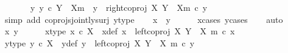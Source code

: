 \begin{isabellebody}
\ \ \ \ {\isasymor}\ \ {\isacharparenleft}{\kern0pt}{\isasymexists}\ y{\isacharprime}{\kern0pt}{\isachardot}{\kern0pt}\ y{\isacharprime}{\kern0pt}\ {\isasymin}\isactrlsub c\ Y\ {\isasymsetminus}\ {\isacharparenleft}{\kern0pt}X{\isacharcomma}{\kern0pt}m{\isacharparenright}{\kern0pt}\ {\isasymand}\ y\ {\isacharequal}{\kern0pt}\ right{\isacharunderscore}{\kern0pt}coproj\ X\ {\isacharparenleft}{\kern0pt}Y\ {\isasymsetminus}\ {\isacharparenleft}{\kern0pt}X{\isacharcomma}{\kern0pt}m{\isacharparenright}{\kern0pt}{\isacharparenright}{\kern0pt}\ {\isasymcirc}\isactrlsub c\ y{\isacharprime}{\kern0pt}{\isacharparenright}{\kern0pt}{\isachardoublequoteclose}\isanewline
\ \ \ \ \isamarkupfalse%
\ {\isacharparenleft}{\kern0pt}simp\ add{\isacharcolon}{\kern0pt}\ coprojs{\isacharunderscore}{\kern0pt}jointly{\isacharunderscore}{\kern0pt}surj\ y{\isacharunderscore}{\kern0pt}type{\isacharparenright}{\kern0pt}\isanewline
\isanewline
\ \ \isamarkupfalse%
\ {\isachardoublequoteopen}x\ {\isacharequal}{\kern0pt}\ y{\isachardoublequoteclose}\isanewline
\ \ \ \ \isamarkupfalse%
\ x{\isacharunderscore}{\kern0pt}cases\ y{\isacharunderscore}{\kern0pt}cases\isanewline
\ \ \isamarkupfalse%
\ auto\isanewline
\ \ \ \ \isamarkupfalse%
\ x{\isacharprime}{\kern0pt}\ y{\isacharprime}{\kern0pt}\isanewline
\ \ \ \ \isamarkupfalse%
\ x{\isacharprime}{\kern0pt}{\isacharunderscore}{\kern0pt}type{\isacharcolon}{\kern0pt}\ {\isachardoublequoteopen}x{\isacharprime}{\kern0pt}\ {\isasymin}\isactrlsub c\ X{\isachardoublequoteclose}\ \ x{\isacharunderscore}{\kern0pt}def{\isacharcolon}{\kern0pt}\ {\isachardoublequoteopen}x\ {\isacharequal}{\kern0pt}\ left{\isacharunderscore}{\kern0pt}coproj\ X\ {\isacharparenleft}{\kern0pt}Y\ {\isasymsetminus}\ {\isacharparenleft}{\kern0pt}X{\isacharcomma}{\kern0pt}\ m{\isacharparenright}{\kern0pt}{\isacharparenright}{\kern0pt}\ {\isasymcirc}\isactrlsub c\ x{\isacharprime}{\kern0pt}{\isachardoublequoteclose}\isanewline
\ \ \ \ \isamarkupfalse%
\ y{\isacharprime}{\kern0pt}{\isacharunderscore}{\kern0pt}type{\isacharcolon}{\kern0pt}\ {\isachardoublequoteopen}y{\isacharprime}{\kern0pt}\ {\isasymin}\isactrlsub c\ X{\isachardoublequoteclose}\ \ y{\isacharunderscore}{\kern0pt}def{\isacharcolon}{\kern0pt}\ {\isachardoublequoteopen}y\ {\isacharequal}{\kern0pt}\ left{\isacharunderscore}{\kern0pt}coproj\ X\ {\isacharparenleft}{\kern0pt}Y\ {\isasymsetminus}\ {\isacharparenleft}{\kern0pt}X{\isacharcomma}{\kern0pt}\ m{\isacharparenright}{\kern0pt}{\isacharparenright}{\kern0pt}\ {\isasymcirc}\isactrlsub c\ y{\isacharprime}{\kern0pt}{\isachardoublequoteclose}\isanewline

\end{isabellebody}
